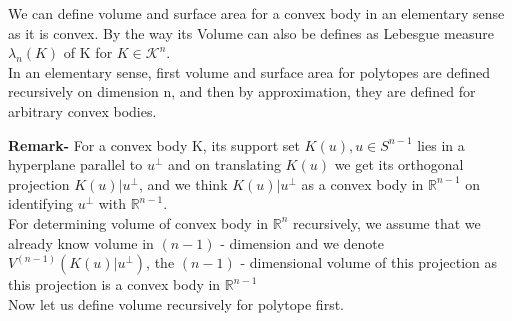 \documentclass[oneside]{book}
\begin{document}
	\normalfont
	
	We can define volume and surface area for a convex body in an elementary sense as it is convex. By the way its Volume can also be defines as Lebesgue measure $\lambda_{n}(K)$ of K  for $ K \in  \mathcal{K}^{n} $. \\
	In an elementary sense, first volume and surface area for polytopes are defined recursively on dimension n, and then by approximation, they are defined for arbitrary convex bodies. \newline
	
	\textbf{Remark-} 
	For a convex body  K, its support set $K(u),u \in S^{n-1} $ lies in a hyperplane parallel to 
	$u^{\perp}$ and on translating $K(u)$ we get its orthogonal projection $K(u) | u^{\perp}$, and we think  $K(u) | u^{\perp}$ as a convex body in $\mathbb{R}^{n-1}$  on identifying $u^{\perp}$ with $\mathbb{R}^{n-1}$. \\
	For determining volume of convex body in $\mathbb{R}^{n}$ recursively, we assume that we already know volume in $(n-1)$ -  dimension and we denote $V^{(n-1)}\left(K(u) | u^{\perp}\right)$, the $(n-1)$ - dimensional volume of this projection as this projection is a convex body in $\mathbb{R}^{n-1}$ 
	\\
	Now let us define volume recursively for polytope first. 
	
\end{document}
